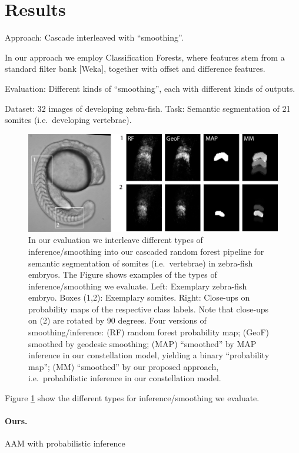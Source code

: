 \documentclass[10pt,twocolumn,letterpaper]{article}
\begin{document}
\section{Results}
Approach: Cascade interleaved with "`smoothing"'. 

In our approach we employ Classification Forests, where features stem from a standard filter bank [Weka], together with offset and difference features. 
%

Evaluation: Different kinds of "`smoothing"', each with different kinds of outputs.

Dataset: 32 images of developing zebra-fish. Task: Semantic segmentation of 21 somites (i.e.\ developing vertebrae).

\begin{figure}[t]
\begin{center}
\includegraphics[width=\columnwidth]{smoothing.jpg} %
\caption{In our evaluation we interleave different types of inference/smoothing into our cascaded random forest pipeline for semantic segmentation of somites (i.e.\ vertebrae) in zebra-fish embryos. 
%
The Figure shows examples of the types of inference/smoothing we evaluate. 
Left: Exemplary zebra-fish embryo. Boxes (1,2): Exemplary somites. Right: Close-ups on probability maps of the respective class labels. Note that close-ups on (2) are rotated by 90 degrees. 
%
Four versions of smoothing/inference: (RF) random forest probability map; (GeoF) smoothed by geodesic smoothing\cite{GeoF2013}; (MAP) "`smoothed"' by MAP inference in our constellation model, yielding a binary "`probability map"'; 
%
(MM) "`smoothed"' by our proposed approach, i.e.\ probabilistic inference in our constellation model.  }
\label{fig:smoothing}
\end{center}
\end{figure}
%
Figure \ref{fig:smoothing} show the different types for inference/smoothing we evaluate. 

\paragraph{Ours. }
AAM with probabilistic inference 
\end{document}
